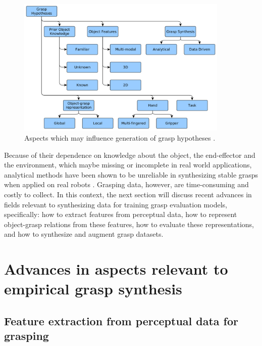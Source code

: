 \documentclass[runningheads]{../llncs}
\begin{document}
\begin{figure}[h!]
    \centering
    \includegraphics[width=0.9\textwidth]{bohg14-grasp_synthesis_mind_map}
    \caption{Aspects which may influence generation of grasp hypotheses \cite{Bohg2014}.}
    \label{fig:grasp_synthesis_mind_map}
\end{figure}

Because of their dependence on knowledge about the object, the end-effector and the environment, which maybe missing
or incomplete in real world applications, analytical methods have been shown to be unreliable in synthesizing stable
grasps when applied on real robots \cite{Kappler2015,Rubert2017,WeiszAllen2012}. Grasping data, however, are
time-consuming and costly to collect. In this context, the next section will discuss recent advances in fields relevant
to synthesizing data for training grasp evaluation models, specifically: how to extract features from perceptual data,
how to represent object-grasp relations from these features, how to evaluate these representations, and how to
synthesize and augment grasp datasets.

\section{Advances in aspects relevant to empirical grasp synthesis} \label{sec:soa}

\subsection{Feature extraction from perceptual data for grasping}
\end{document}
